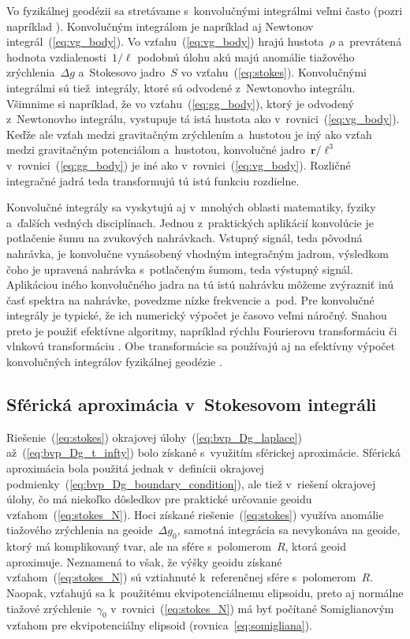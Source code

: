 \documentclass[a4paper, 12pt]{book}
\let\vec\mathbf
\begin{document}
Vo fyzikálnej geodézii sa stretávame s~konvolučnými integrálmi veľmi často 
(pozri napríklad \cite{Jekeli2017}).  Konvolučným integrálom je napríklad aj 
Newtonov integrál~(\ref{eq:vg_body}).  Vo vzťahu~(\ref{eq:vg_body}) hrajú 
hustota~$\rho$ a~prevrátená hodnota vzdialenosti~$1 \slash \ell$ podobnú úlohu 
akú majú anomálie tiažového zrýchlenia~$\Delta g$ a~Stokesovo jadro~$S$ vo 
vzťahu~(\ref{eq:stokes}). Konvolučnými integrálmi sú tiež~integrály, ktoré sú 
odvodené z~Newtonovho integrálu.  Všimnime si napríklad, že vo 
vzťahu~(\ref{eq:gg_body}), ktorý je odvodený z~Newtonovho integrálu, vystupuje 
tá istá hustota ako v~rovnici~(\ref{eq:vg_body}).  Keďže ale vzťah medzi 
gravitačným zrýchlením a~hustotou je iný ako vzťah medzi gravitačným 
potenciálom a~hustotou, konvolučné jadro~$\vec r \slash \ell^3$ 
v~rovnici~(\ref{eq:gg_body}) je iné ako v~rovnici~(\ref{eq:vg_body}).  Rozličné 
integračné jadrá teda transformujú tú istú funkciu rozdielne.

Konvolučné integrály sa vyskytujú aj v~mnohých oblasti matematiky, fyziky 
a~ďalších vedných disciplínach.  Jednou z~praktických aplikácií konvolúcie je 
potlačenie šumu na zvukových nahrávkach.  Vstupný signál, teda pôvodná 
nahrávka, je konvolučne vynásobený vhodným integračným jadrom, výsledkom čoho 
je upravená nahrávka s~potlačeným šumom, teda výstupný signál.  Aplikáciou 
iného konvolučného jadra na tú istú nahrávku môžeme zvýrazniť inú časť spektra 
na nahrávke, povedzme nízke frekvencie a~pod.  Pre konvolučné integrály je 
typické, že ich numerický výpočet je časovo veľmi náročný.  Snahou preto je 
použiť efektívne algoritmy, napríklad rýchlu Fourierovu transformáciu 
\parencite{PressNumericalRecipes} či vlnkovú transformáciu 
\parencite{KellerWavelets}.  Obe transformácie sa používajú aj na efektívny 
výpočet konvolučných integrálov fyzikálnej geodézie \parencite[pozri 
napríklad][]{Forsberg1984,Freeden1998a,SansoGeoidDetermination}.


\subsection{Sférická aproximácia v~Stokesovom integráli}
\label{sec:stokes_spherical_approximation}

Riešenie~(\ref{eq:stokes}) okrajovej úlohy~(\ref{eq:bvp_Dg_laplace}) 
až~(\ref{eq:bvp_Dg_t_infty}) bolo získané s~využitím sférickej aproximácie.  
Sférická aproximácia bola použitá jednak v~definícii okrajovej 
podmienky~(\ref{eq:bvp_Dg_boundary_condition}), ale tiež v~riešení okrajovej 
úlohy, čo má niekoľko dôsledkov pre praktické určovanie geoidu 
vzťahom~(\ref{eq:stokes_N}).  Hoci získané riešenie~(\ref{eq:stokes}) využíva 
anomálie tiažového zrýchlenia na geoide~$\Delta g_0$, samotná integrácia sa 
nevykonáva na geoide, ktorý má komplikovaný tvar, ale na sfére s~polomerom~$R$, 
ktorá geoid aproximuje.  Neznamená to však, že výšky geoidu získané 
vzťahom~(\ref{eq:stokes_N}) sú vztiahnuté k~referenčnej sfére s~polomerom~$R$.  
Naopak, vzťahujú sa k~použitému ekvipotenciálnemu elipsoidu, preto aj normálne 
tiažové zrýchlenie~$\gamma_0$ v~rovnici~(\ref{eq:stokes_N}) má byť počítané 
Somiglianovým vzťahom pre ekvipotenciálny elipsoid 
(rovnica~\ref{eq:somigliana}).
\end{document}
